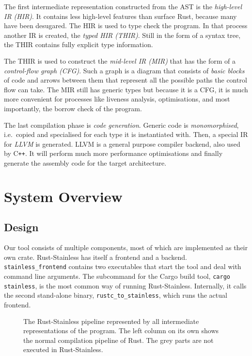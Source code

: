 The first intermediate representation constructed from the AST is the
\emph{high-level IR (HIR)}. It contains less high-level features than surface
Rust, because many have been desugared. The HIR is used to type check the
program. In that process another IR is created, the \emph{typed HIR (THIR)}.
Still in the form of a syntax tree, the THIR contains fully explicit type
information.

The THIR is used to construct the \emph{mid-level IR (MIR)} that has the form of
a \emph{control-flow graph (CFG)}. Such a graph is a diagram that consists of
\emph{basic blocks} of code and arrows between them that represent all the
possible paths the control flow can take. The MIR still has generic types but
because it is a CFG, it is much more convenient for processes like liveness
analysis, optimisations, and most importantly, the borrow check of the program.

The last compilation phase is \emph{code generation}. Generic code is
\emph{monomorphised}, i.e.~copied and specialised for each type it is
instantiated with. Then, a special IR for \emph{LLVM} \cite{llvm} is generated.
LLVM is a general purpose compiler backend, also used by C\texttt{++}. It will
perform much more performance optimisations and finally generate the assembly
code for the target architecture.

\section{System Overview}

\subsection{Design}

Our tool consists of multiple components, most of which are implemented as their
own crate. Rust-Stainless has itself a frontend and a backend.
\lstinline!stainless_frontend! contains two executables that start the tool and
deal with command line arguments. The subcommand for the Cargo build tool,
\passthrough{\lstinline!cargo stainless!}, is the most common way of running
Rust-Stainless. Internally, it calls the second stand-alone binary,
\lstinline!rustc_to_stainless!, which runs the actual frontend.

\begin{figure}
  \begin{center}
  
  \caption{
    The Rust-Stainless pipeline represented by all intermediate representations
    of the program. The left column on its own shows the normal compilation
    pipeline of Rust. The grey parts are not executed in Rust-Stainless.
  }
  \label{fig:flowchart}
  \end{center}
\end{figure}

